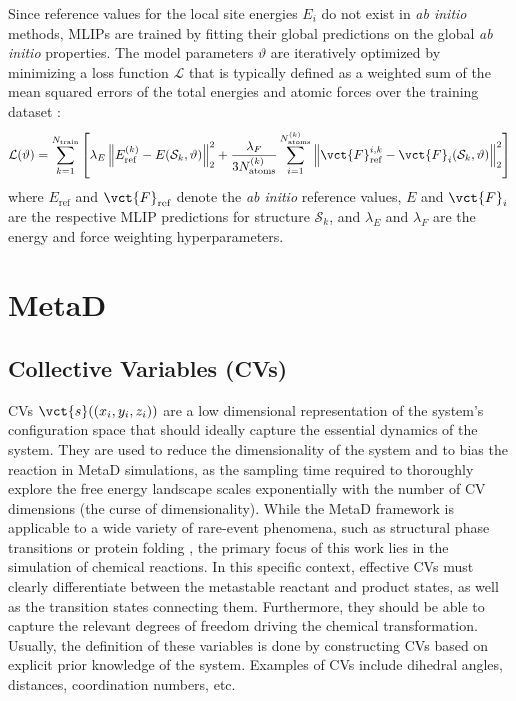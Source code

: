 Since reference values for the local site energies $E_i$ do not exist in \textit{ab initio} methods, MLIPs are trained by fitting their global predictions on the global \textit{ab initio} properties. 
The model parameters $\vartheta$ are iteratively optimized by minimizing a loss function $\mathcal{L}$ that is typically defined as a weighted sum of the mean squared errors of the total energies and atomic forces over the training dataset \cite{Schaefer2025}:
\begin{align}
    \mathcal{L}(\vartheta) = \sum_{k=1}^{N_{\text{train}}} \left[ \lambda_E \left\| E_{\text{ref}}^{(k)} - E(\mathcal{S}_k, \vartheta) \right\|_2^2 + \frac{\lambda_F}{3N_{\text{atoms}}^{(k)}} \sum_{i=1}^{N_{\text{atoms}}^{(k)}} \left\| \vct{F}_{\text{ref}}^{i,k} - \vct{F}_i(\mathcal{S}_k, \vartheta) \right\|_2^2 \right]
\end{align}
\noindent where $E_{\text{ref}}$ and $\vct{F}_{\text{ref}}$ denote the \textit{ab initio} reference values, $E$ and $\vct{F}_i$ are the respective MLIP predictions for structure $\mathcal{S}_k$, and $\lambda_E$ and $\lambda_F$ are the energy and force weighting hyperparameters.
\section{MetaD}

\subsection{Collective Variables (CVs)} \label{subsec: collective_variables_definition}
CVs $\vct{s}({(x_i,y_i,z_i)})$ are a low dimensional representation of the system's 
configuration space that should ideally capture the essential dynamics of the system.
They are used to reduce the dimensionality of the system and to bias the reaction in MetaD simulations, as the sampling time required to thoroughly explore the free energy landscape scales exponentially with the number of CV dimensions (the curse of dimensionality).
While the MetaD framework is applicable to a wide variety of rare-event phenomena, such as structural phase transitions or protein folding \cite{Laio2008}, the primary focus of this work lies in the simulation of chemical reactions. 
In this specific context, effective CVs must clearly differentiate between the metastable reactant and product states, as well as the transition states connecting them. 
Furthermore, they should be able to capture the relevant degrees of freedom driving the chemical transformation. 
Usually, the definition of these variables is done by constructing CVs based on explicit prior knowledge of the system.
Examples of CVs include dihedral angles, distances, coordination numbers, etc.
\cite{Laio2008} \cite{Schaefer2025} \\

